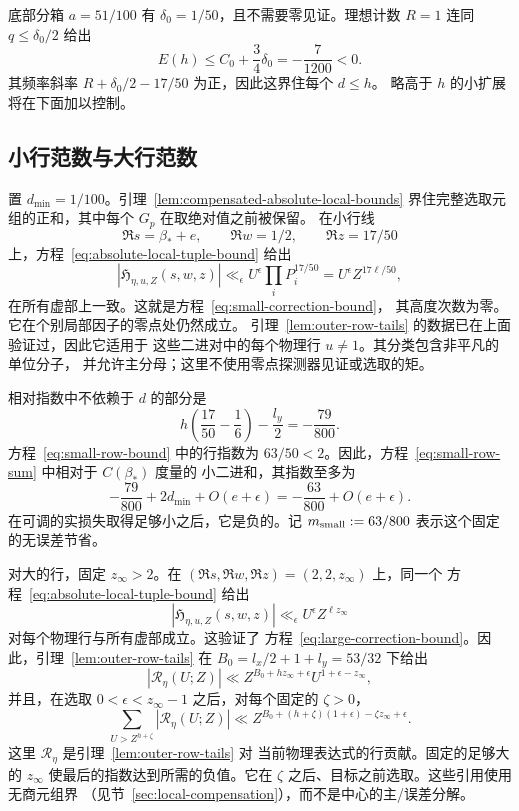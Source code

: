\documentclass[11pt,a4paper]{article}
\numberwithin{equation}{section}
\numberwithin{figure}{section}
\theoremstyle{definition}
\theoremstyle{remark}
\begin{document}
底部分箱 \(a=51/100\) 有 \(\delta_0=1/50\)，且不需要零见证。理想计数
\(R=1\) 连同 \(q\le\delta_0/2\) 给出
\begin{equation}\label{eq:floor-bound}
 E(h)\le C_0+\frac34\delta_0=-\frac7{1200}<0.
\end{equation}
其频率斜率 \(R+\delta_0/2-17/50\) 为正，因此这界住每个 \(d\le h\)。
略高于 \(h\) 的小扩展将在下面加以控制。

\subsection{小行范数与大行范数}\label{sec:tails}

置 \(d_{\min}=1/100\)。引理~\ref{lem:compensated-absolute-local-bounds}
界住完整选取元组的正和，其中每个 \(G_p\) 在取绝对值之前被保留。
在小行线
\[
 \Re s=\beta_*+e,\qquad \Re w=1/2,\qquad \Re z=17/50
\]
上，方程~\eqref{eq:absolute-local-tuple-bound} 给出
\[
 |\mathfrak H_{\eta,u,Z}(s,w,z)|
 \ll_\epsilon U^\epsilon\prod_iP_i^{17/50}
 =U^\epsilon Z^{17\ell/50},
\]
在所有虚部上一致。这就是方程~\eqref{eq:small-correction-bound}，
其高度次数为零。它在个别局部因子的零点处仍然成立。
引理~\ref{lem:outer-row-tails} 的数据已在上面验证过，因此它适用于
这些二进对中的每个物理行 \(u\ne1\)。其分类包含非平凡的单位分子，
并允许主分母；这里不使用零点探测器见证或选取的矩。

相对指数中不依赖于 \(d\) 的部分是
\begin{equation}\label{eq:small-frequency-margin}
 h\left(\frac{17}{50}-\frac16\right)-\frac{l_y}{2}
 =-\frac{79}{800}.
\end{equation}
方程~\eqref{eq:small-row-bound} 中的行指数为
\(63/50<2\)。因此，方程~\eqref{eq:small-row-sum} 中相对于 \(C(\beta_*)\) 度量的
小二进和，其指数至多为
\[
 -\frac{79}{800}+2d_{\min}+O(e+\epsilon)
 =-\frac{63}{800}+O(e+\epsilon).
\]
在可调的实损失取得足够小之后，它是负的。记
\(m_{\rm small}:=63/800\) 表示这个固定的无误差节省。

对大的行，固定 \(z_\infty>2\)。在
\((\Re s,\Re w,\Re z)=(2,2,z_\infty)\) 上，同一个
方程~\eqref{eq:absolute-local-tuple-bound} 给出
\[
 |\mathfrak H_{\eta,u,Z}(s,w,z)|
 \ll_\epsilon U^\epsilon Z^{\ell z_\infty}
\]
对每个物理行与所有虚部成立。这验证了
方程~\eqref{eq:large-correction-bound}。因此，引理~\ref{lem:outer-row-tails}
在 \(B_0=l_x/2+1+l_y=53/32\) 下给出
\[
 |\mathscr R_\eta(U;Z)|
 \ll Z^{B_0+hz_\infty+\epsilon}U^{1+\epsilon-z_\infty},
\]
并且，在选取 \(0<\epsilon<z_\infty-1\) 之后，对每个固定的 \(\zeta>0\)，
\[
 \sum_{U>Z^{h+\zeta}}|\mathscr R_\eta(U;Z)|
 \ll
 Z^{B_0+(h+\zeta)(1+\epsilon)-\zeta z_\infty+\epsilon}.
\]
这里 \(\mathscr R_\eta\) 是引理~\ref{lem:outer-row-tails} 对
当前物理表达式的行贡献。固定的足够大的 \(z_\infty\)
使最后的指数达到所需的负值。它在
\(\zeta\) 之后、目标之前选取。这些引用使用无商元组界
（见节~\ref{sec:local-compensation}），而不是中心的主/误差分解。
\end{document}
